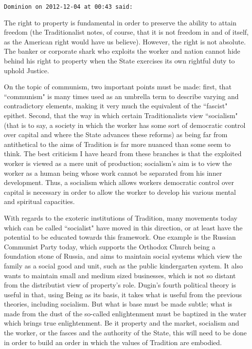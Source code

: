 \begin{footnotesize}
\begin{sffamily}
\hfill

\texttt{Dominion on 2012-12-04 at 00:43 said: }

The right to property is fundamental in order to preserve the ability to attain freedom (the Traditionalist notes, of course, that it is not freedom in and of itself, as the American right would have us believe). However, the right is not absolute. The banker or corporate shark who exploits the worker and nation cannot hide behind his right to property when the State exercises its own rightful duty to uphold Justice.

On the topic of communism, two important points must be made: first, that ``communism" is many times used as an umbrella term to describe varying and contradictory elements, making it very much the equivalent of the ``fascist" epithet. Second, that the way in which certain Traditionalists view ``socialism" (that is to say, a society in which the worker has some sort of democratic control over capital and where the State advances these reforms) as being far from antithetical to the aims of Tradition is far more nuanced than some seem to think. The best criticism I have heard from these branches is that the exploited worker is viewed as a mere unit of production; socialism's aim is to view the worker as a human being whose work cannot be separated from his inner development. Thus, a socialism which allows workers democratic control over capital is necessary in order to allow the worker to develop his various mental and spiritual capacities. 

With regards to the exoteric institutions of Tradition, many movements today which can be called ``socialist" have moved in this direction, or at least have the potential to be educated towards this framework. One example is the Russian Communist Party today, which supports the Orthodox Church being a foundation stone of Russia, and aims to maintain social systems which view the family as a social good and unit, such as the public kindergarten system. It also wants to maintain small and medium sized businesses, which is not so distant from the distributist view of property's role. Dugin's fourth political theory is useful in that, using Being as its basis, it takes what is useful from the previous theories, including socialism. But what is base must be made subtle; what is made from the dust of the so-called enlightenment must be baptized in the water which brings true enlightenment. Be it property and the market, socialism and the worker, or the fasces and the authority of the State, this will need to be done in order to build an order in which the values of Tradition are embodied.



\end{sffamily}
\end{footnotesize}
